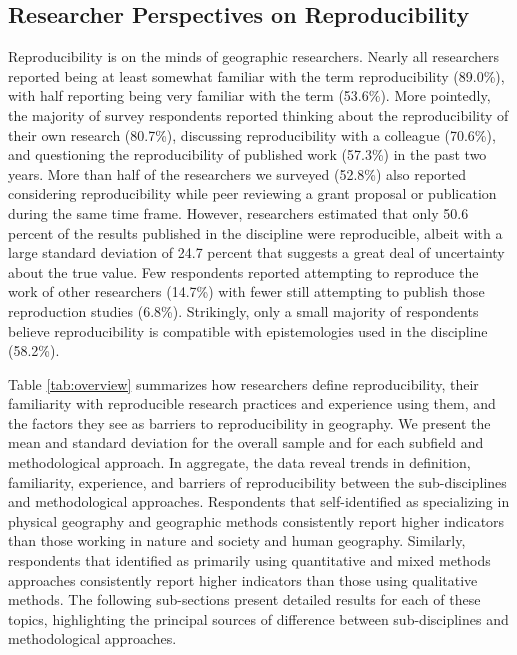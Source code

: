 \documentclass[]{interact}
\theoremstyle{plain}%
\theoremstyle{definition}
\theoremstyle{remark}
\begin{document}
\subsection*{Researcher Perspectives on Reproducibility}
Reproducibility is on the minds of geographic researchers.
Nearly all researchers reported being at least somewhat familiar with the term reproducibility (89.0\%), with half reporting being very familiar with the term (53.6\%).
More pointedly, the majority of survey respondents reported thinking about the reproducibility of their own research (80.7\%), discussing reproducibility with a colleague (70.6\%), and questioning the reproducibility of published work (57.3\%) in the past two years. 
More than half of the researchers we surveyed (52.8\%) also reported considering reproducibility while peer reviewing a grant proposal or publication during the same time frame. 
However, researchers estimated that only 50.6 percent of the results published in the discipline were reproducible, albeit with a large standard deviation of 24.7 percent that suggests a great deal of uncertainty about the true value. 
Few respondents reported attempting to reproduce the work of other researchers (14.7\%) with fewer still attempting to publish those reproduction studies (6.8\%). 
Strikingly, only a small majority of respondents believe reproducibility is compatible with epistemologies used in the discipline (58.2\%). 

Table \ref{tab:overview} summarizes how researchers define reproducibility, their familiarity with reproducible research practices and experience using them, and the factors they see as barriers to reproducibility in geography. 
We present the mean and standard deviation for the overall sample and for each subfield and methodological approach.
In aggregate, the data reveal trends in definition, familiarity, experience, and barriers of reproducibility between the sub-disciplines and methodological approaches. 
Respondents that self-identified as specializing in physical geography and geographic methods consistently report higher indicators than those working in nature and society and human geography.
Similarly, respondents that identified as primarily using quantitative and mixed methods approaches consistently report higher indicators than those using qualitative methods.
The following sub-sections present detailed results for each of these topics, highlighting the principal sources of difference between sub-disciplines and methodological approaches.
\end{document}
